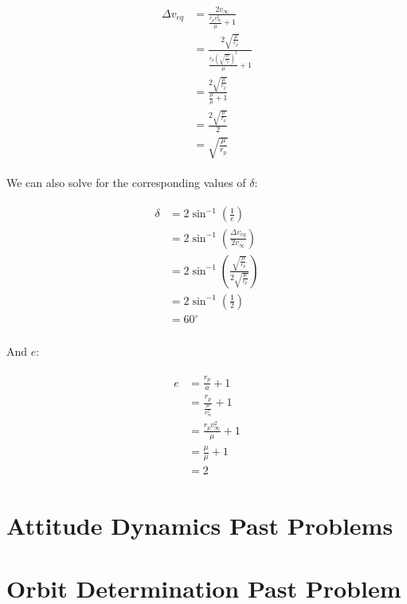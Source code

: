 \documentclass[
]{article}
\let\oldsection\section
\renewcommand\section{\clearpage\oldsection}
\begin{document}
\[\begin{aligned}
\begin{aligned}
    \Delta v_{eq} &= \frac{2 v_\infty}{\frac{r_p v_\infty^2}{\mu} + 1} \\
    &= \frac{2 \sqrt{\frac{\mu}{r_p}}}{\frac{r_p \left( \sqrt{\frac{\mu}{r_p}} \right)^2}{\mu} + 1} \\
    &= \frac{2 \sqrt{\frac{\mu}{r_p}}}{\frac{\mu}{\mu} + 1} \\
    &= \frac{2 \sqrt{\frac{\mu}{r_p}}}{2} \\
    &= \sqrt{\frac{\mu}{r_p}}
\end{aligned}
\end{aligned}\]

We can also solve for the corresponding values of \(\delta\):

\[\begin{aligned}
\begin{aligned}
    \delta &= 2 \sin^{-1} \left( \frac{1}{e} \right) \\
    &= 2 \sin^{-1} \left( \frac{\Delta v_{eq}}{2 v_\infty} \right) \\
    &= 2 \sin^{-1} \left( \frac{\sqrt{\frac{\mu}{r_p}}}{2 \sqrt{\frac{\mu}{r_p}}} \right) \\
    &= 2 \sin^{-1} \left( \frac{1}{2} \right) \\
    &= 60^\circ \\
\end{aligned}
\end{aligned}\]

And \(e\):

\[\begin{aligned}
\begin{aligned}
    e &= \frac{r_p}{a} + 1 \\
    &= \frac{r_p}{\frac{\mu}{v_\infty^2}} + 1 \\
    &= \frac{r_p v_\infty^2}{\mu} + 1 \\
    &= \frac{\mu}{\mu} + 1 \\
    &= 2
\end{aligned}
\end{aligned}\]

\section{Attitude Dynamics Past
Problems}\label{attitude-dynamics-past-problems}

\section{Orbit Determination Past
Problem}\label{orbit-determination-past-problem}
\end{document}
